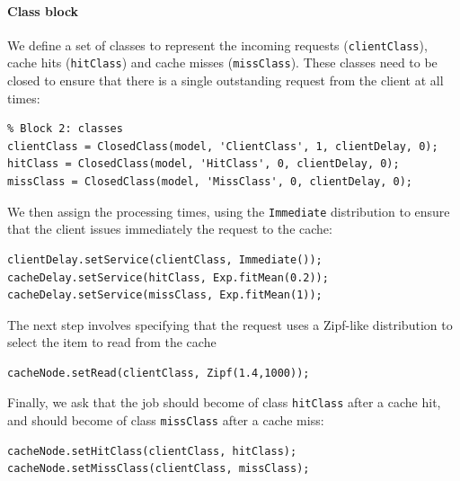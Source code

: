 \paragraph{Class block}
We define a set of classes to represent the incoming requests (\texttt{clientClass}), cache hits (\texttt{hitClass}) and cache misses (\texttt{missClass}). These classes need to be closed to ensure that there is a single outstanding request from the client at all times:
\begin{lstlisting}
% Block 2: classes
clientClass = ClosedClass(model, 'ClientClass', 1, clientDelay, 0);
hitClass = ClosedClass(model, 'HitClass', 0, clientDelay, 0);
missClass = ClosedClass(model, 'MissClass', 0, clientDelay, 0);
\end{lstlisting}
We then assign the processing times, using the \texttt{Immediate} distribution to ensure that the client issues immediately the request to the cache:
\begin{lstlisting}
clientDelay.setService(clientClass, Immediate());
cacheDelay.setService(hitClass, Exp.fitMean(0.2));
cacheDelay.setService(missClass, Exp.fitMean(1));
\end{lstlisting}
The next step involves specifying that the request uses a Zipf-like distribution to select the item to read from the cache
\begin{lstlisting}
cacheNode.setRead(clientClass, Zipf(1.4,1000));
\end{lstlisting}
Finally, we ask that the job should become of class \texttt{hitClass} after a cache hit, and should become of class \texttt{missClass} after a cache miss:
\begin{lstlisting}
cacheNode.setHitClass(clientClass, hitClass);
cacheNode.setMissClass(clientClass, missClass);
\end{lstlisting}

